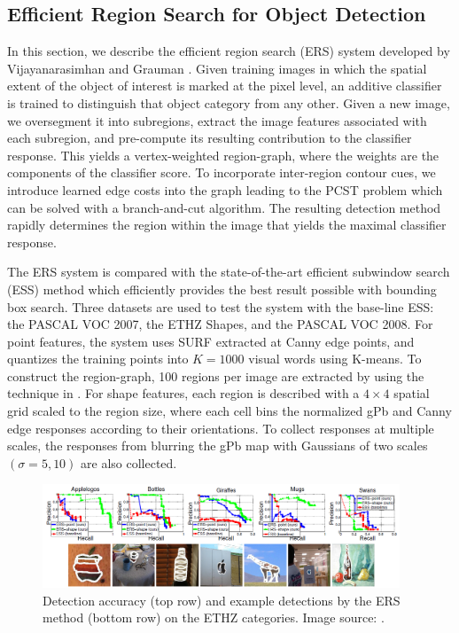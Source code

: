 \documentclass{SMBV12}
\begin{document}
\subsection{Efficient Region Search for Object Detection}

In this section, we describe the efficient region search (ERS) system developed by Vijayanarasimhan and Grauman \cite{VijayGrauman2011}. Given training images in which the spatial extent of the object of interest is marked at the pixel level, an additive classifier is trained to distinguish that object category from any other. Given a new image, we oversegment it into subregions, extract the image features associated with each subregion, and pre-compute its resulting contribution to the classifier response. This yields a vertex-weighted region-graph, where the weights are the components of the classifier score. To incorporate inter-region contour cues, we introduce learned edge costs into the graph leading to the PCST problem which can be solved with a branch-and-cut algorithm. The resulting detection method rapidly determines the region within the image that yields the maximal classifier response.

The ERS system is compared with the state-of-the-art efficient subwindow search (ESS) method \cite{lampert2008beyond} which efficiently provides the best result possible with bounding box search. Three datasets are used to test the system with the base-line ESS: the PASCAL VOC 2007, the ETHZ Shapes, and the PASCAL VOC 2008. For point features, the system uses SURF extracted at Canny edge points, and quantizes the training points into $K = 1000$ visual words using K-means. To construct the region-graph, 100 regions per image are extracted by using the technique in \cite{arbelaez2009contours}. For shape features, each region is described with a $4 \times 4$ spatial grid scaled to the region size, where each cell bins the normalized gPb and Canny edge responses according to their orientations. To collect responses at multiple scales, the responses from blurring the gPb map with Gaussians of two scales $(\sigma = 5, 10)$ are also collected.

\begin{figure}[htbp]
    \centering
    \includegraphics[width=0.95\textwidth]{images/ERS_result.png}
    \caption{Detection accuracy (top row) and example detections by the ERS method (bottom row) on the ETHZ categories. Image source: \cite{VijayGrauman2011}.}
    \label{fig:ers_result}
\end{figure}
\end{document}
